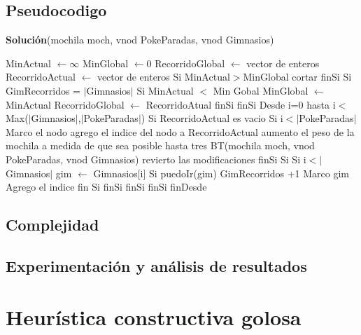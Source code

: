 \documentclass[spanish,12pt]{article}
\begin{document}
\subsection{Pseudocodigo}

\begin{algorithm}[H]{\textbf{Solución}(mochila moch, vnod  PokeParadas, vnod Gimnasios)}
	\begin{algorithmic}[1]
		\State MinActual $\gets \infty$
		\State MinGlobal $\gets 0$
		\State RecorridoGlobal $\gets$ vector de enteros
		\State RecorridoActual $\gets$ vector de enteros
		\State Si  MinActual$>$MinGlobal  
			 \State \quad cortar
		\State finSi
		\State Si GimRecorridos = $|$Gimnasios$|$ %
		\State \quad Si MinActual $<$ Min Gobal
		\State \qquad MinGlobal $\gets$ MinActual
		\State \qquad RecorridoGlobal $\gets$ RecorridoAtual
		\State \quad finSi
		\State finSi
		\State Desde i=0 hasta i$<$Max($|$Gimnasios$|$,$|$PokeParadas$|$)
		\State \quad Si RecorridoActual es vacio
		\State \qquad Si i$<|$PokeParadas$|$ 
		\State \qquad \quad Marco el nodo
		\State \qquad \quad agrego el indice del nodo a RecorridoActual
		\State \qquad \quad aumento el peso de la mochila a medida de que sea posible hasta tres
		\State \qquad \quad BT(mochila moch, vnod  PokeParadas, vnod Gimnasios)
		\State \qquad \quad revierto las modificaciones
		\State \qquad finSi
		\State \qquad Si
		\State \qquad \quad Si i$< |$Gimnasios$|$
		\State \qquad \qquad gim $\gets$ Gimnasios[i]
		\State \qquad \qquad Si puedoIr(gim)
		\State \qquad \qquad \quad GimRecorridos +1
		\State \qquad \qquad \quad Marco gim
		\State \qquad \qquad \quad Agrego el indice 
		\State \qquad \qquad fin Si
		\State \qquad \quad finSi
		\State \qquad finSi  			
		\State \quad finSi
		\State finDesde
  
	\end{algorithmic}
\end{algorithm}

\subsection{Complejidad}

\subsection{Experimentación y análisis de resultados}



\section{Heurística constructiva golosa}
\end{document}

